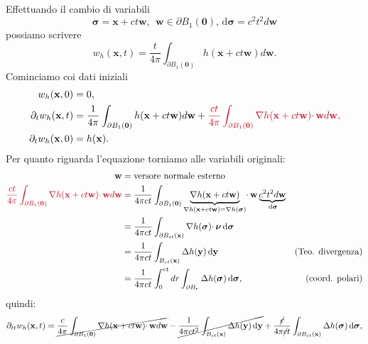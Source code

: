 \documentclass[10pt,a4paper,twoside,openright]{book}
\newcommand{\x}{\mathbf{x}}
\newcommand{\y}{\mathbf{y}}
\newcommand{\zer}{\mathbf{0}}
\newcommand{\sigg}{\bm{\sigma}}
\newcommand{\nuu}{\bm{\nu}}
\newcommand{\de}{\,\mathrm d}
\newcommand{\dyy}{\de \y}
\newcommand{\dsig}{\de \sigg}
\begin{document}
\begin{dimostrazione}
	Effettuando il cambio di variabili
	\begin{equation*}
		\sigg =\x +ct\mathbf{w} ,\ \ \mathbf{w} \in \partial B_{1}(\zer) ,\dsig =c^{2} t^{2} d\mathbf{w}
	\end{equation*}
	possiamo scrivere
	\begin{equation*}
		w_{h}(\x ,t) =\frac{t}{4\pi }\int _{\partial B_{1}(\zer)} h(\x +ct\mathbf{w}) d\mathbf{w} .
	\end{equation*}
	Cominciamo coi dati iniziali
	\begin{align*}
		w_{h}(\x ,0)               & =0,                                                                                                                                                                                                                                              \\
		\partial _{t} w_{h}(\x ,t) & =\frac{1}{4\pi }\int _{\partial B_{1}(\zer)} h(\x +ct\mathbf{w}) d\mathbf{w} +\textcolor[rgb]{0.82,0.01,0.11}{\frac{ct}{4\pi }\int _{\partial B_{1}(\zer)}\nabla h(\x +ct\mathbf{w})\cdotp \mathbf{w} d\mathbf{w} ,} \\
		\partial _{t} w_{h}(\x ,0) & =h(\x) .                                                                                                                                                                                                                                 
	\end{align*}
	Per quanto riguarda l'equazione torniamo alle variabili originali:
	\begin{align*}
		\mathbf{w} & =\text{versore normale esterno} & \\
		\textcolor[rgb]{0.82,0.01,0.11}{\frac{ct}{4\pi }\int _{\partial B_{1}(\zer)}\nabla h(\x+ct\mathbf{w})\cdotp \mathbf{w}d\mathbf{w}} & =\frac{1}{4\pi ct}\int _{\partial B_{1}(\zer)}\underbrace{\nabla h(\x +ct\mathbf{w})}_{\nabla h(\x +ct\mathbf{w}) =\nabla h(\sigg)} \cdotp \mathbf{w}\underbrace{c^{2} t^{2} d\mathbf{w}}_{\dsig} & \\
	 	& =\frac{1}{4\pi ct}\int _{\partial B_{ct}(\x)} \nabla h(\sigg) \cdotp \nuu \dsig & \\
	 	& =\frac{1}{4\pi ct}\int _{B_{ct}(\x)} \Delta h(\y) \dyy & \text{(Teo. divergenza)}\\
	 	& =\frac{1}{4\pi ct}\int _{0}^{ct} dr\int _{\partial B_{r}} \Delta h(\sigg) \dsig , & \text{(coord. polari)}
	\end{align*}
	quindi:
	\begin{equation*}
		\partial _{tt} w_{h}(\x ,t) =\cancel{\frac{c}{4\pi }\int _{\partial B_{1}(\zer)} \nabla h(\x +ct\mathbf{w}) \cdotp \mathbf{w} d\mathbf{w}} -\cancel{\frac{1}{4\pi ct^{2}}\int _{B_{ct}(\x)} \Delta h(\y) \dyy} +\frac{\cancel{c}}{4\pi \cancel{c} t}\int _{\partial B_{ct}(\x)} \Delta h(\sigg) \dsig ,

\end{equation*}
\end{dimostrazione}
\end{document}
